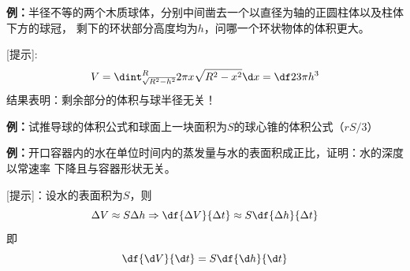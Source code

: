\begin{center}
\end{center}

{\bf 例：}半径不等的两个木质球体，分别中间凿去一个以直径为轴的正圆柱体以及柱体下方的球冠，
剩下的环状部分高度均为$h$，问哪一个环状物体的体积更大。

[提示]:
$$V=\dint_{\sqrt{R^2-h^2}}^R2\pi x\sqrt{R^2-x^2}\d x=\df23\pi h^3$$
结果表明：剩余部分的体积与球半径无关！

{\bf 例：}试推导球的体积公式和球面上一块面积为$S$的球心锥的体积公式（$rS/3$）

{\bf 例：}开口容器内的水在单位时间内的蒸发量与水的表面积成正比，证明：水的深度以常速率
下降且与容器形状无关。

[提示]：设水的表面积为$S$，则
$$\Delta V\approx S\Delta h\Rightarrow
\df{\Delta V}{\Delta t}\approx S\df{\Delta h}{\Delta t}$$
即
$$\df{\d V}{\d t}=S\df{\d h}{\d t}$$

